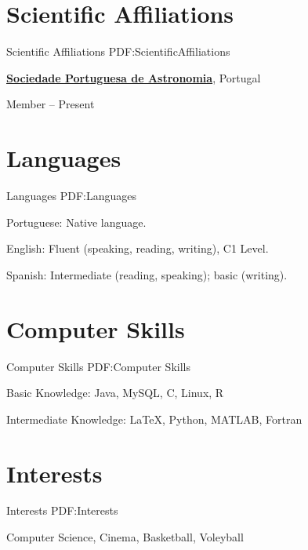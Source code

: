\documentclass[letterpaper,10pt,oneside]{article}
\begin{document}
\begin{body}

\section
{Scientific Affiliations}
{Scientific Affiliations}
{PDF:ScientificAffiliations}

\href{http://www.sp-astronomia.pt/}
{\textbf{Sociedade Portuguesa de Astronomia}},
Portugal

\GapNoBreak
\BulletItem
Member
\hfill
{} --
Present


\section
{Languages}
{Languages}
{PDF:Languages}

\BulletItem
Portuguese: Native language.

\GapNoBreak
\BulletItem
English: Fluent (speaking, reading, writing), C1 Level.

\GapNoBreak
\BulletItem
Spanish: Intermediate (reading, speaking); basic (writing).


\section
{Computer Skills}
{Computer Skills}
{PDF:Computer Skills}

\BulletItem
Basic Knowledge: Java, MySQL, C, Linux, R

\GapNoBreak
\BulletItem
Intermediate Knowledge: {\LaTeX}, Python, MATLAB, Fortran


\section
{Interests}
{Interests}
{PDF:Interests}

Computer Science, Cinema, Basketball, Voleyball
\end{body}
\label{LastPage}~
\end{document}
